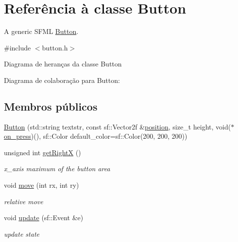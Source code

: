 \hypertarget{classButton}{}\section{Referência à classe Button}
\label{classButton}


A generic S\+F\+ML \hyperlink{classButton}{Button}.  




{\ttfamily \#include $<$button.\+h$>$}



Diagrama de heranças da classe Button


Diagrama de colaboração para Button\+:
\subsection*{Membros públicos}
\begin{DoxyCompactItemize}
\item 
\hyperlink{classButton_a3f6796e5e92c8a69a2288e01a8996078}{Button} (std\+::string textstr, const sf\+::\+Vector2f \&\hyperlink{classButton_afd3823c96d76e1152fda9fc080f45b01}{position}, size\+\_\+t height, void($\ast$\hyperlink{classButton_ae9295b79451566476a9d2e563d0e7ce2}{on\+\_\+press})(), sf\+::\+Color default\+\_\+color=sf\+::\+Color(200, 200, 200))
\item 
unsigned int \hyperlink{classButton_a1bc1735913f9fa01531f10c2a30f0202}{get\+RightX} ()
\begin{DoxyCompactList}\small\item\em x\+\_\+axis maximum of the button area \end{DoxyCompactList}\item 
void \hyperlink{classButton_ab6b0888289d2b733a1e1066578aac900}{move} (int rx, int ry)
\begin{DoxyCompactList}\small\item\em relative move \end{DoxyCompactList}\item 
void \hyperlink{classButton_aaf2f85db7d93b19783f9e859ad58e185}{update} (sf\+::\+Event \&e)
\begin{DoxyCompactList}\small\item\em update state \end{DoxyCompactList}\end{DoxyCompactItemize}

